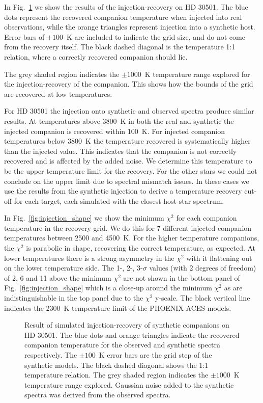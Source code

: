 In Fig.~\ref{fig:injection-recovery} we show the results of the injection-recovery on {HD 30501}. The blue dots represent the recovered companion temperature when injected into real observations, while the orange triangles represent injection into a synthetic host. Error bars of \(\pm100\)~K are included to indicate the grid size, and do not come from the recovery itself. The black dashed diagonal is the temperature 1:1 relation, where a correctly recovered companion should lie.

The grey shaded region indicates the \(\pm1000\)~K temperature range explored for the injection-recovery of the companion. This shows how the bounds of the grid are recovered at low temperatures.

For {HD 30501} the injection onto synthetic and observed spectra produce similar results. At temperatures above 3800~K in both the real and synthetic the injected companion is recovered within 100~K. For injected companion temperatures below 3800~K the temperature recovered is systematically higher than the injected value. This indicates that the companion is not correctly recovered and is affected by the added noise. We determine this temperature to be the upper temperature limit for the recovery. For the other stars we could not conclude on the upper limit due to spectral mismatch issues. In these cases we use the results from the synthetic injection to derive a temperature recovery cut-off for each target, each simulated with the closest host star spectrum.

In Fig.~\ref{fig:injection_shape} we show the minimum \(\chi^2\) for each companion temperature in the recovery grid. We do this for 7 different injected companion temperatures between 2500 and 4500~K. For the higher temperature companions, the \(\chi^2\) is parabolic in shape, recovering the correct temperature, as expected. At lower temperatures there is a strong asymmetry in the \(\chi^2\) with it flattening out on the lower temperature side. 
The 1-, 2-, 3-\(\sigma\) values (with 2 degrees of freedom) of 2, 6 and 11 above the minimum \(\chi^2\) are not shown in the bottom panel of Fig.~\ref{fig:injection_shape} which is a close-up around the minimum \(\chi^2\) as are indistinguishable in the top panel due to the \(\chi^2\) y-scale. The black vertical line indicates the 2300~K temperature limit of the PHOENIX-ACES models.

\begin{figure}
    \centering
    \caption{Result of simulated injection-recovery of synthetic companions on {HD 30501}. The blue dots and orange triangles indicate the recovered companion temperature for the observed and synthetic spectra respectively. The \(\pm100\)~K error bars are the grid step of the synthetic models. The black dashed diagonal shows the 1:1 temperature relation. The grey shaded region indicates the \(\pm1000\)~K temperature range explored. Gaussian noise added to the synthetic spectra was derived from the observed spectra.}
    \label{fig:injection-recovery}
\end{figure}


